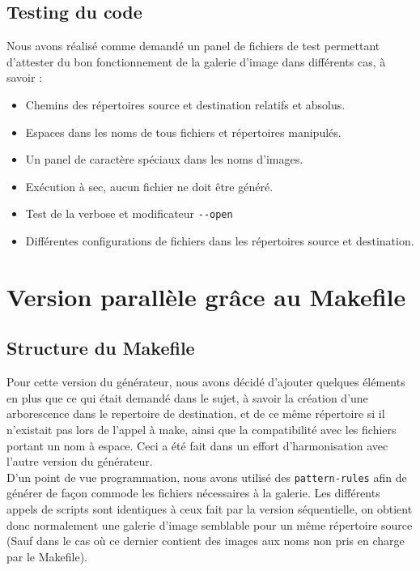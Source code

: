 \documentclass[10.9pt]{article}
\begin{document}
\subsection{Testing du code}
Nous avons réalisé comme demandé un panel de fichiers de test
permettant d'attester du bon fonctionnement de la galerie d'image dans
différents cas, à savoir :
\begin{itemize}
  \item Chemins des répertoires source et destination relatifs et
    absolus.
  \item Espaces dans les noms de tous fichiers et répertoires
    manipulés.
  \item Un panel de caractère spéciaux dans les noms d'images.
  \item Exécution à sec, aucun fichier ne doit être généré.
  \item Test de la verbose et modificateur \lstinline'--open'
  \item Différentes configurations de fichiers dans les répertoires
    source et destination.
\end{itemize}

\section{Version parallèle grâce au Makefile}

\subsection{Structure du Makefile}

Pour cette version du générateur, nous avons décidé d'ajouter quelques
éléments en plus que ce qui était demandé dans le sujet, à savoir la
création d'une arborescence dans le repertoire de destination, et de
ce même répertoire si il n'existait pas lors de l'appel à
make, ainsi que la compatibilité avec les fichiers portant un nom à
espace. Ceci a été fait dans un effort d'harmonisation avec l'autre
version du générateur. \\  

D'un point de vue programmation, nous avons utilisé des
\lstinline!pattern-rules! afin de générer de façon commode les
fichiers nécessaires à la galerie. Les différents appels de scripts
sont identiques à ceux fait par la version séquentielle, on obtient
donc normalement une galerie d'image semblable pour un même répertoire
source (Sauf dans le cas où ce dernier contient des images aux noms
non pris en charge par le Makefile). \\
\end{document}
